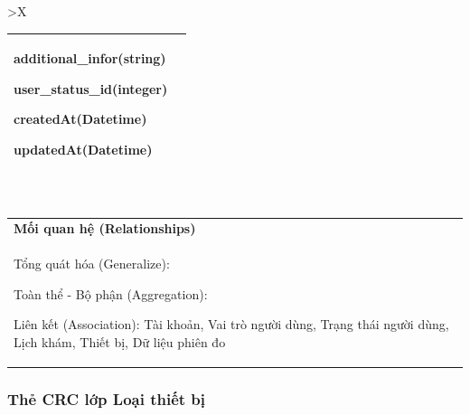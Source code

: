 \begin{xltabular}{\textwidth}{
		>{\centering\arraybackslash}X
	}
\begin{tabularx}{0.9\textwidth}{|X|X|}
		additional\_infor(string)

		user\_status\_id(integer)

		createdAt(Datetime)

		updatedAt(Datetime)
		\\ \hline
	\end{tabularx}
	\\
	\begin{tabularx}{0.9\textwidth}{|X|}
		\hline
		\textbf{Mối quan hệ (Relationships)} \\
		Tổng quát hóa (Generalize):

		Toàn thể - Bộ phận (Aggregation):

		Liên kết (Association): Tài khoản, Vai trò người dùng, Trạng thái người dùng, Lịch khám, Thiết bị, Dữ liệu phiên đo
		\\
		\hline
	\end{tabularx}
\end{xltabular}

\subsubsection{Thẻ CRC lớp Loại thiết bị}

